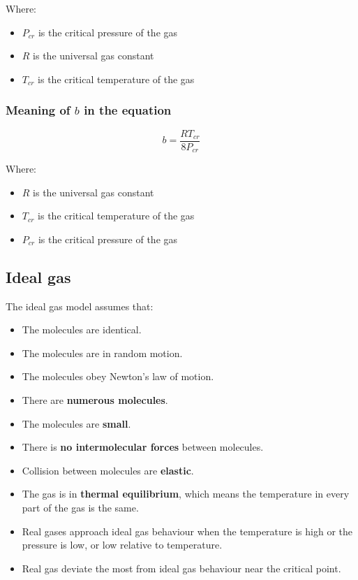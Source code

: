 \documentclass[11pt]{article}
\begin{document}
Where:
\begin{itemize}
\item \(P_{cr}\) is the critical pressure of the gas
\item \(R\) is the universal gas constant
\item \(T_{cr}\) is the critical temperature of the gas
\end{itemize}

\subsubsection{Meaning of \(b\) in the equation}
\label{sec:org73f5cb1}
\[b = \frac{RT_{cr}}{8 P_{cr}}\]

Where:
\begin{itemize}
\item \(R\) is the universal gas constant
\item \(T_{cr}\) is the critical temperature of the gas
\item \(P_{cr}\) is the critical pressure of the gas
\end{itemize}

\subsection{Ideal gas}
\label{sec:org32655fa}
The ideal gas model assumes that:
\begin{itemize}
\item The molecules are identical.
\item The molecules are in random motion.
\item The molecules obey Newton's law of motion.
\item There are \textbf{numerous molecules}.
\item The molecules are \textbf{small}.
\item There is \textbf{no intermolecular forces} between molecules.
\item Collision between molecules are \textbf{elastic}.
\item The gas is in \textbf{thermal equilibrium}, which means the temperature in every part of the gas is the same.
\item Real gases approach ideal gas behaviour when the temperature is high or the pressure is low, or low relative to temperature.
\item Real gas deviate the most from ideal gas behaviour near the critical point.
\end{itemize}
\end{document}
